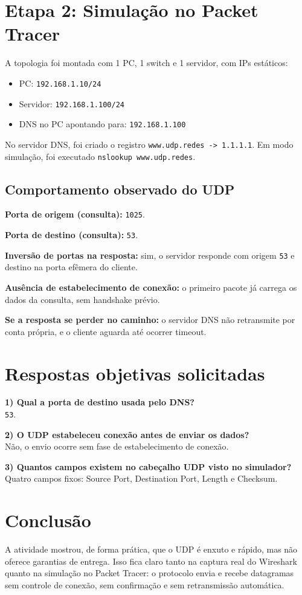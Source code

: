 \documentclass[12pt,a4paper]{article}
\begin{document}
\section*{Etapa 2: Simulação no Packet Tracer}

A topologia foi montada com 1 PC, 1 switch e 1 servidor, com IPs estáticos:
\begin{itemize}
\item PC: \texttt{192.168.1.10/24}
\item Servidor: \texttt{192.168.1.100/24}
\item DNS no PC apontando para: \texttt{192.168.1.100}
\end{itemize}

No servidor DNS, foi criado o registro \texttt{www.udp.redes -> 1.1.1.1}. Em modo simulação, foi executado \texttt{nslookup www.udp.redes}.

\subsection*{Comportamento observado do UDP}

\textbf{Porta de origem (consulta):} \texttt{1025}.

\textbf{Porta de destino (consulta):} \texttt{53}.

\textbf{Inversão de portas na resposta:} sim, o servidor responde com origem \texttt{53} e destino na porta efêmera do cliente.

\textbf{Ausência de estabelecimento de conexão:} o primeiro pacote já carrega os dados da consulta, sem handshake prévio.

\textbf{Se a resposta se perder no caminho:} o servidor DNS não retransmite por conta própria, e o cliente aguarda até ocorrer timeout.

\section*{Respostas objetivas solicitadas}

\textbf{1) Qual a porta de destino usada pelo DNS?}\\
\texttt{53}.

\textbf{2) O UDP estabeleceu conexão antes de enviar os dados?}\\
Não, o envio ocorre sem fase de estabelecimento de conexão.

\textbf{3) Quantos campos existem no cabeçalho UDP visto no simulador?}\\
Quatro campos fixos: Source Port, Destination Port, Length e Checksum.

\section*{Conclusão}

A atividade mostrou, de forma prática, que o UDP é enxuto e rápido, mas não oferece garantias de entrega. Isso fica claro tanto na captura real do Wireshark quanto na simulação no Packet Tracer: o protocolo envia e recebe datagramas sem controle de conexão, sem confirmação e sem retransmissão automática.
\end{document}
